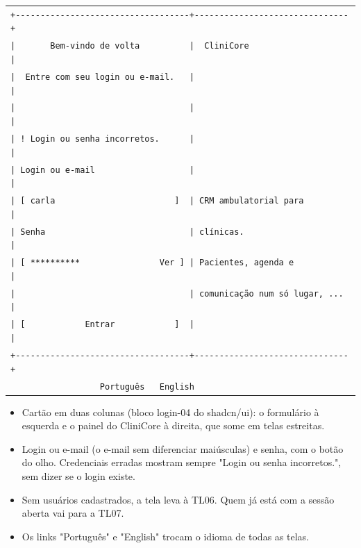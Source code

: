 \begin{center}

\begin{lrbox}{\interfaceWireframe}
\ttfamily\small
\begin{tabular}{@{}l@{}}
\verb`+-----------------------------------+-------------------------------+` \\
\verb`|       Bem-vindo de volta          |  CliniCore                    |` \\
\verb`|  Entre com seu login ou e-mail.   |                               |` \\
\verb`|                                   |                               |` \\
\verb`| ! Login ou senha incorretos.      |                               |` \\
\verb`| Login ou e-mail                   |                               |` \\
\verb`| [ carla                        ]  | CRM ambulatorial para         |` \\
\verb`| Senha                             | clínicas.                     |` \\
\verb`| [ **********                Ver ] | Pacientes, agenda e           |` \\
\verb`|                                   | comunicação num só lugar, ... |` \\
\verb`| [            Entrar            ]  |                               |` \\
\verb`+-----------------------------------+-------------------------------+` \\
\verb`                  Português   English` \\
\end{tabular}
\end{lrbox}

\resizebox{\textwidth}{!}{\usebox{\interfaceWireframe}}

\end{center}

\begin{itemize}[leftmargin=*,itemsep=0.3em]

\item Cartão em duas colunas (bloco login-04 do shadcn/ui): o formulário à esquerda e o painel do CliniCore à direita, que some em telas estreitas.

\item Login ou e-mail (o e-mail sem diferenciar maiúsculas) e senha, com o botão do olho. Credenciais erradas mostram sempre "Login ou senha incorretos.", sem dizer se o login existe.

\item Sem usuários cadastrados, a tela leva à TL06. Quem já está com a sessão aberta vai para a TL07.

\item Os links "Português" e "English" trocam o idioma de todas as telas.

\end{itemize}

